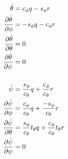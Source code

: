 \documentclass[a4paper]{article}
\begin{document}
\begin{align*}
  \\
  \dot{\theta} &= c_\phi q - s_\phi r \\
  \frac{\partial \dot{\theta}}{\partial \phi} &= -s_\phi q - c_\phi r \\
  \frac{\partial \dot{\theta}}{\partial \theta} &= 0 \\
  \frac{\partial \dot{\theta}}{\partial \psi} &= 0 \\
  \\
  \dot{\psi} &= \frac{s_\phi}{c_\theta} q + \frac{c_\phi}{c_\theta} r \\
  \frac{\partial \dot{\psi}}{\partial \phi} &= \frac{c_\phi}{c_\theta} q +
    \frac{-s_\phi}{c_\theta} r \\
  \frac{\partial \dot{\psi}}{\partial \theta} &= \frac{s_\phi}{c_\theta} t_\theta q +
  \frac{c_\phi}{c_\theta}t_\theta r \\
  \frac{\partial \dot{\psi}}{\partial \psi} &= 0 \\
\end{align*}
\end{document}
